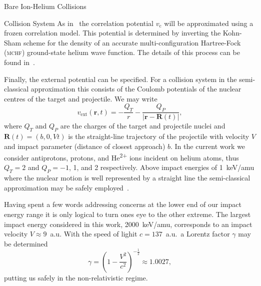 \documentclass[a5paper, 9 pt]{extreport}
\begin{document}
\begin{chapter}{Bare Ion-Helium Collisions \label{chap:p-he2p-he}}
\begin{section}{Collision System \label{sec:p-he2p-he-sys}}
      As in~\cite{pbarhe} the correlation potential $v_\mathrm{c}$ will be approximated using a frozen
      correlation model. This potential is determined by inverting the Kohn-Sham scheme for the density
      of an accurate multi-configuration Hartree-Fock~\cite{mchf} (\textsc{mchf}) ground-state helium
      wave function. The details of this process can be found in~\cite{thesis, pbarhe}.

      Finally, the external potential can be specified. For a collision system in the semi-classical
      approximation this consists of the Coulomb potentials of the nuclear centres of the target and
      projectile. We may write
      \begin{equation} \label{eq:phe2p-ext}
         v_\mathrm{ext}(\mathbf{r},t) = -\frac{Q_T}{r}
         - \frac{Q_P}{\left| \mathbf{r} - \mathbf{R}(t) \right|},
      \end{equation}
      where $Q_T$ and $Q_P$ are the charges of the target and projectile nuclei and
      $\mathbf{R}(t) = (b,0,V t)$ is the straight-line trajectory of the projectile with velocity $V$ and
      impact parameter (distance of closest approach) $b$. In the current work we consider antiprotons,
      protons, and He\textsuperscript{2+} ions incident on helium atoms, thus $Q_T = 2$ and
      $Q_P = -1$, 1, and 2 respectively. Above impact energies of 1~keV/amu where the nuclear motion is
      well represented by a straight line the semi-classical approximation may be safely
      employed~\cite{bgm-rev}.

      Having spent a few words addressing concerns at the lower end of our impact energy range it is
      only logical to turn ones eye to the other extreme. The largest impact energy considered in this
      work, 2000~keV/amu, corresponds to an impact velocity $V \approx 9$~a.u. With the speed of lighit
      $c = 137$~a.u.\ a Lorentz factor $\gamma$ may be determined
      \begin{equation} \label{eq:lorentz}
         \gamma = \left( 1 - \frac{V^2}{c^2} \right)^{-\frac{1}{2}} \approx 1.0027,
      \end{equation}
      putting us safely in the non-relativistic regime.


\end{section}
\end{chapter}
\end{document}
